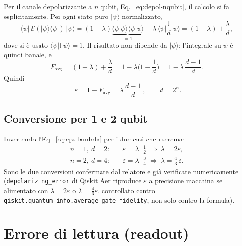 \documentclass[11pt,a4paper]{article}
\newcommand{\ket}[1]{\lvert #1 \rangle}
\newcommand{\bra}[1]{\langle #1 \rvert}
\begin{document}
Per il canale depolarizzante a $n$ qubit, Eq.~\eqref{eq:depol-nqubit}, il calcolo si fa
esplicitamente. Per ogni stato puro $\ket\psi$ normalizzato,
\begin{equation}
\bra\psi\,\mathcal E(\ket\psi\bra\psi)\,\ket\psi =
(1-\lambda)\underbrace{\bra\psi\psi\rangle\langle\psi\ket\psi}_{=1} +
\lambda\,\bra\psi\frac{\mathbb{I}}{d}\ket\psi =
(1-\lambda) + \frac{\lambda}{d},
\end{equation}
dove si è usato $\bra\psi\mathbb{I}\ket\psi=1$. Il risultato non dipende da
$\ket\psi$: l'integrale su $\psi$ è quindi banale, e
\begin{equation}
F_\text{avg} = (1-\lambda) + \frac{\lambda}{d} = 1-\lambda\Big(1-\frac1d\Big)
= 1-\lambda\,\frac{d-1}{d}.
\end{equation}
Quindi
\begin{equation}
\boxed{\;\varepsilon = 1-F_\text{avg} = \lambda\,\frac{d-1}{d}\;}, \qquad d=2^n.
\label{eq:eps-lambda}
\end{equation}

\subsection{Conversione per 1 e 2 qubit}

Invertendo l'Eq.~\eqref{eq:eps-lambda} per i due casi che useremo:
\begin{align}
n=1,\ d=2:&\quad \varepsilon = \lambda\cdot\frac12 \;\Longrightarrow\; \lambda = 2\varepsilon, \\[4pt]
n=2,\ d=4:&\quad \varepsilon = \lambda\cdot\frac34 \;\Longrightarrow\; \lambda = \frac43\,\varepsilon.
\end{align}
Sono le due conversioni confermate dal relatore e già verificate numericamente
(\texttt{depolarizing\_\allowbreak error} di Qiskit Aer riproduce $\varepsilon$ a
precisione macchina se alimentato con $\lambda=2\varepsilon$ o
$\lambda=\tfrac43\varepsilon$,
controllato contro \texttt{qiskit.quantum\_info.\allowbreak average\_gate\_fidelity},
non solo contro la formula).

\section{Errore di lettura (readout)}
\end{document}

